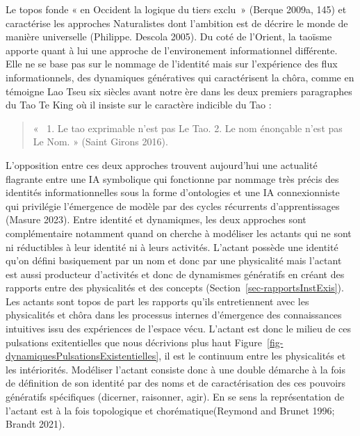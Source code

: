\documentclass[
  letterpaper,
  DIV=11,
  numbers=noendperiod]{scrreprt}
\begin{document}
Le topos fonde « en Occident la logique du tiers exclu~» (Berque 2009a,
145) et caractérise les approches Naturalistes dont l'ambition est de
décrire le monde de manière universelle (Philippe. Descola 2005). Du
coté de l'Orient, la taoïsme apporte quant à lui une approche de
l'environement informationnel différente. Elle ne se base pas sur le
nommage de l'identité mais sur l'expérience des flux informationnels,
des dynamiques génératives qui caractérisent la chôra, comme en témoigne
Lao Tseu six siècles avant notre ère dans les deux premiers paragraphes
du Tao Te King où il insiste sur le caractère indicible du Tao :

\begin{quote}
«~ 1. Le tao exprimable n'est pas Le Tao. 2. Le nom énonçable n'est pas
Le Nom. » (Saint Girons 2016).
\end{quote}

L'opposition entre ces deux approches trouvent aujourd'hui une actualité
flagrante entre une IA symbolique qui fonctionne par nommage très précis
des identités informationnelles sous la forme d'ontologies et une IA
connexionniste qui privilégie l'émergence de modèle par des cycles
récurrents d'apprentissages (Masure 2023). Entre identité et dynamiqmes,
les deux approches sont complémentaire notamment quand on cherche à
modéliser les actants qui ne sont ni réductibles à leur identité ni à
leurs activités. L'actant possède une identité qu'on défini basiquement
par un nom et donc par une physicalité mais l'actant est aussi
producteur d'activités et donc de dynamismes génératifs en créant des
rapports entre des physicalités et des concepts
(Section~\ref{sec-rapportsInstExis}). Les actants sont topos de part les
rapports qu'ils entretiennent avec les physicalités et chôra dans les
processus internes d'émergence des connaissances intuitives issu des
expériences de l'espace vécu. L'actant est donc le milieu de ces
pulsations exitentielles que nous décrivions plus haut
Figure~\ref{fig-dynamiquesPulsationsExistentielles}, il est le continuum
entre les physicalités et les intériorités. Modéliser l'actant consiste
donc à une double démarche à la fois de définition de son identité par
des noms et de caractérisation des ces pouvoirs génératifs spécifiques
(dicerner, raisonner, agir). En se sens la représentation de l'actant
est à la fois topologique et chorématique(Reymond and Brunet 1996;
Brandt 2021).
\end{document}
